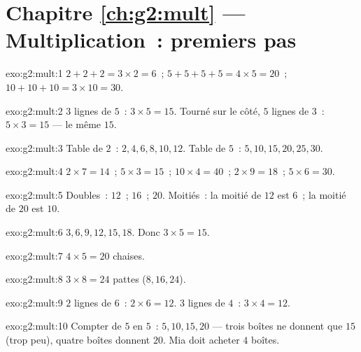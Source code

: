 \section*{Chapitre \ref{ch:g2:mult} --- Multiplication~: premiers pas}

\begin{solution}{exo:g2:mult:1}
$2 + 2 + 2 = 3 \times 2 = 6$~; \quad
$5 + 5 + 5 + 5 = 4 \times 5 = 20$~; \quad
$10 + 10 + 10 = 3 \times 10 = 30$.
\end{solution}

\begin{solution}{exo:g2:mult:2}
$3$ lignes de $5$~: $3 \times 5 = 15$. Tourné sur le côté, $5$
lignes de $3$~: $5 \times 3 = 15$ --- le même $15$.
\end{solution}

\begin{solution}{exo:g2:mult:3}
Table de $2$~: $2, 4, 6, 8, 10, 12$. Table de $5$~:
$5, 10, 15, 20, 25, 30$.
\end{solution}

\begin{solution}{exo:g2:mult:4}
$2 \times 7 = 14$~; \quad $5 \times 3 = 15$~; \quad
$10 \times 4 = 40$~; \quad $2 \times 9 = 18$~; \quad
$5 \times 6 = 30$.
\end{solution}

\begin{solution}{exo:g2:mult:5}
Doubles~: $12$~; $16$~; $20$. Moitiés~: la moitié de $12$ est
$6$~; la moitié de $20$ est $10$.
\end{solution}

\begin{solution}{exo:g2:mult:6}
$3, 6, 9, 12, 15, 18$. Donc $3 \times 5 = 15$.
\end{solution}

\begin{solution}{exo:g2:mult:7}
$4 \times 5 = 20$ chaises.
\end{solution}

\begin{solution}{exo:g2:mult:8}
$3 \times 8 = 24$ pattes ($8, 16, 24$).
\end{solution}

\begin{solution}{exo:g2:mult:9}
$2$ lignes de $6$~: $2 \times 6 = 12$. $3$ lignes de $4$~:
$3 \times 4 = 12$.
\end{solution}

\begin{solution}{exo:g2:mult:10}
Compter de $5$ en $5$~: $5, 10, 15, 20$ --- trois boîtes ne donnent
que $15$ (trop peu), quatre boîtes donnent $20$. Mia doit acheter
$4$ boîtes.
\end{solution}
